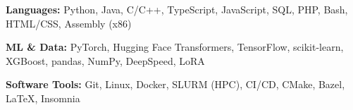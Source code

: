 
\begin{cvskills}

  \cvskill
    {\bf Languages:} %
    { Python, Java, C/C++, TypeScript, JavaScript, SQL, PHP, Bash, HTML/CSS, Assembly (x86)}

  \cvskill
    {\bf ML \& Data:} %
    { PyTorch, Hugging Face Transformers, TensorFlow, scikit-learn, XGBoost, pandas, NumPy, DeepSpeed, LoRA}

  \cvskill
    {\bf Software Tools:} %
    { Git, Linux, Docker, SLURM (HPC), CI/CD, CMake, Bazel, LaTeX, Insomnia}

\end{cvskills}
